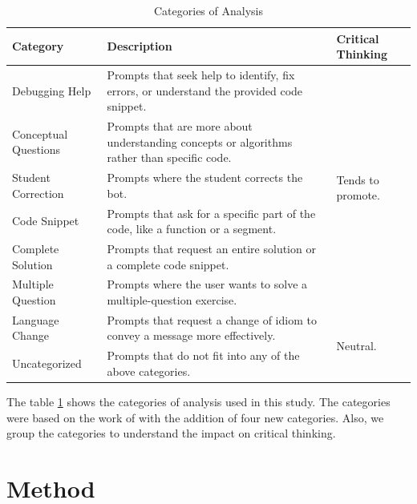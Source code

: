 \documentclass[conference]{IEEEtran}
\begin{document}
\begin{table}[htbp]
\caption{Categories of Analysis}
    \begin{center}
    \begin{tabular}{|p{3cm}|p{5cm}|p{3cm}|}
    \hline
    \textbf{Category} & \textbf{Description} & \textbf{Critical Thinking} \\
    \hline
    Debugging Help & Prompts that seek help to identify, fix errors, or understand the provided code snippet. & \multirow{6}{3cm}{Tends to promote.} \\
    Conceptual Questions & Prompts that are more about understanding concepts or algorithms rather than specific code. & \\
    Student Correction & Prompts where the student corrects the bot. & \\
    \hline
    Code Snippet & Prompts that ask for a specific part of the code, like a function or a segment. & \multirow{6}{3cm}{Tends not to promote.} \\
    Complete Solution & Prompts that request an entire solution or a complete code snippet. & \\
    Multiple Question & Prompts where the user wants to solve a multiple-question exercise. & \\
    \hline
    Language Change & Prompts that request a change of idiom to convey a message more effectively. & \multirow{3}{3cm}{Neutral.} \\
    Uncategorized & Prompts that do not fit into any of the above categories. & \\
    \hline
    \end{tabular}
    \label{tab:categories}
    \end{center}
\end{table}

The table \ref{tab:categories} shows the categories of analysis used in this
study. The categories were based on the work of
\cite{Ghimire24} with the addition of four new categories.
Also, we group the categories to understand the impact on critical thinking.


\section{Method}
\end{document}
